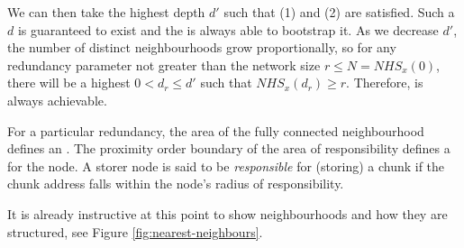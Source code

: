 We can then take the highest depth $d'$ such that (1) and (2) are satisfied. Such a $d$ is guaranteed to exist and the  is always able to bootstrap it. As we decrease $d'$, the number of distinct neighbourhoods grow proportionally, so for any redundancy parameter not greater than the network size $r\leq N=\mathit{NHS}_x(0)$, there will be a highest $0<d_r\leq d'$ such that $\mathit{NHS}_x(d_r)\geq r$. Therefore,  is always achievable. 



For a particular redundancy, the area of the fully connected neighbourhood defines an . The proximity order boundary of the area of responsibility defines a  for the node. A storer node is said to be \emph{responsible} for (storing) a chunk if the chunk address falls within the node's radius of responsibility.

It is already instructive at this point to show neighbourhoods and how they are structured, see Figure \ref{fig:nearest-neighbours}. 

